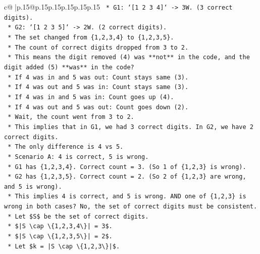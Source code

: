\documentclass{article}
\begin{document}
{\begin{supertabular}{c@{$\;$}|p{.15\linewidth}@{}p{.15\linewidth}p{.15\linewidth}p{.15\linewidth}p{.15\linewidth}p{.15\linewidth}}
{{{\texttt{            *   G1: `{[}1 2 3 4{]}` {-}> 3W. (3 correct digits).} \\
\texttt{            *   G2: `{[}1 2 3 5{]}` {-}> 2W. (2 correct digits).} \\
\texttt{            *   The set changed from \{1,2,3,4\} to \{1,2,3,5\}.} \\
\texttt{            *   The count of correct digits dropped from 3 to 2.} \\
\texttt{            *   This means the digit removed (4) was **not** in the code, and the digit added (5) **was** in the code?} \\
\texttt{                *   If 4 was in and 5 was out: Count stays same (3).} \\
\texttt{                *   If 4 was out and 5 was in: Count stays same (3).} \\
\texttt{                *   If 4 was in and 5 was in: Count goes up (4).} \\
\texttt{                *   If 4 was out and 5 was out: Count goes down (2).} \\
\texttt{            *   Wait, the count went from 3 to 2.} \\
\texttt{            *   This implies that in G1, we had 3 correct digits. In G2, we have 2 correct digits.} \\
\texttt{            *   The only difference is 4 vs 5.} \\
\texttt{            *   Scenario A: 4 is correct, 5 is wrong.} \\
\texttt{                *   G1 has \{1,2,3,4\}. Correct count = 3. (So 1 of \{1,2,3\} is wrong).} \\
\texttt{                *   G2 has \{1,2,3,5\}. Correct count = 2. (So 2 of \{1,2,3\} are wrong, and 5 is wrong).} \\
\texttt{                *   This implies 4 is correct, and 5 is wrong. AND one of \{1,2,3\} is wrong in both cases? No, the set of correct digits must be consistent.} \\
\texttt{                *   Let \$S\$ be the set of correct digits.} \\
\texttt{                *   \$|S \textbackslash{}cap \textbackslash{}\{1,2,3,4\textbackslash{}\}| = 3\$.} \\
\texttt{                *   \$|S \textbackslash{}cap \textbackslash{}\{1,2,3,5\textbackslash{}\}| = 2\$.} \\
\texttt{                *   Let \$k = |S \textbackslash{}cap \textbackslash{}\{1,2,3\textbackslash{}\}|\$.} \\
}}}
\end{supertabular}}
\end{document}
